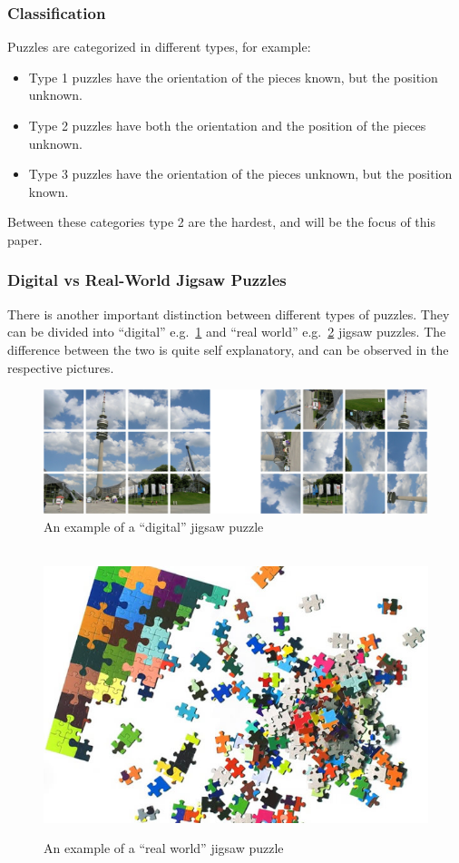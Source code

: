 \documentclass{article}
\begin{document}
\subsubsection{Classification}
Puzzles are categorized in different types, for example:
\begin{itemize}
  \item Type 1 puzzles have the orientation of the pieces known, but the position unknown. 
  \item Type 2 puzzles have both the orientation and the position of the pieces unknown.
  \item Type 3 puzzles have the orientation of the pieces unknown, but the position known.
\end{itemize}
Between these categories type 2 are the hardest, and will be the focus of this paper.

\subsubsection{Digital vs Real-World Jigsaw Puzzles}

There is  another important distinction between different types of puzzles.
They can be divided into “digital” e.g.~\cref{fig:figure_digital_puzzle} and
“real world” e.g.~\cref{fig:figure_real_puzzle} jigsaw puzzles.
The difference between the two is quite self explanatory,
and can be observed in the respective pictures.
\label{document:DigitalVSReal}

\begin{figure}[H]
    \caption{An example of a “digital” jigsaw  puzzle}\label{fig:figure_digital_puzzle}
    \centering
    \includegraphics[height=0.25\textwidth]{pictures/digital_puzzle.png}
\end{figure}

\begin{figure}[H]
    \caption{An example of a ``real world'' jigsaw  puzzle}~\label{fig:figure_real_puzzle}
    \includegraphics[height=0.25\textwidth]{pictures/real_puzzle.jpg}
    \centering

\end{figure}
\end{document}
